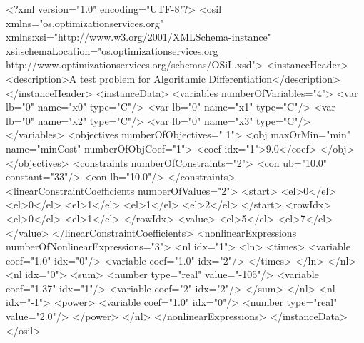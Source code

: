 \documentclass[11pt]{article}
\newcommand{\bibpath}{/Users/kmartin/Documents/files/misc}
\renewcommand{\_}{{\char"5F}}
\renewcommand{\{}{{\char"7B}}
\renewcommand{\}}{{\char"7D}}
\renewcommand{\^}{{\char"0D}}
\renewcommand{\'}{{\char"0D}}
\begin{document}
\begin{verbatimtab}
<?xml version="1.0" encoding="UTF-8"?>
<osil xmlns="os.optimizationservices.org"
xmlns:xsi="http://www.w3.org/2001/XMLSchema-instance"
xsi:schemaLocation="os.optimizationservices.org 
http://www.optimizationservices.org/schemas/OSiL.xsd">
	<instanceHeader>
		<description>A test problem for Algorithmic Differentiation</description>
	</instanceHeader>
	<instanceData>
		<variables numberOfVariables="4">
			<var lb="0" name="x0" type="C"/>
			<var lb="0" name="x1" type="C"/>
			<var lb="0" name="x2" type="C"/>
			<var lb="0" name="x3" type="C"/>
		</variables>
		<objectives numberOfObjectives=" 1">
			<obj maxOrMin="min" name="minCost" numberOfObjCoef="1">
				<coef idx="1">9.0</coef>
			</obj>
		</objectives>
		<constraints numberOfConstraints="2">
			<con ub="10.0" constant="33"/>
			<con lb="10.0"/>
		</constraints>
		<linearConstraintCoefficients numberOfValues="2">
			<start>
				<el>0</el>
				<el>0</el>
				<el>1</el>
				<el>1</el>
				<el>2</el>
			</start>
			<rowIdx>
				<el>0</el>
				<el>1</el>
			</rowIdx>
			<value>
				<el>5</el>
				<el>7</el>
			</value>
		</linearConstraintCoefficients>
		<nonlinearExpressions numberOfNonlinearExpressions="3">
			<nl idx="1">
				<ln>
					<times>
						<variable coef="1.0" idx="0"/>
						<variable coef="1.0" idx="2"/>
					</times>	
				</ln>
			</nl>
			<nl idx="0">
				<sum>
					<number type="real" value="-105"/>
					<variable coef="1.37" idx="1"/>
					<variable coef="2" idx="2"/>
				</sum>	
			</nl>
			<nl idx="-1">
				<power>
					<variable coef="1.0" idx="0"/>
					<number type="real" value="2.0"/>
				</power>
			</nl>
		</nonlinearExpressions>
	</instanceData>
</osil>
\end{verbatimtab}



\end{document}
